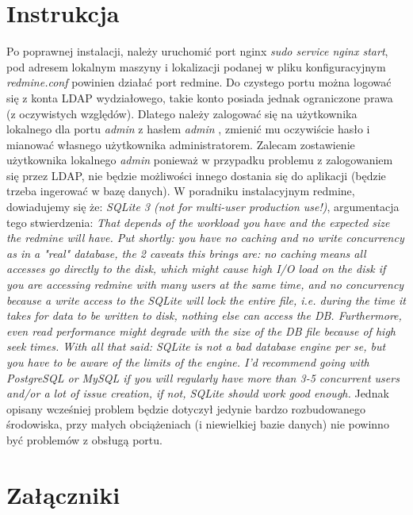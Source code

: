 \documentclass[a4paper,11pt,notitlepage]{article}
\begin{document}
\section{Instrukcja}

Po poprawnej instalacji, należy uruchomić port nginx \textit{sudo service nginx start}, pod adresem lokalnym maszyny i lokalizacji podanej w pliku konfiguracyjnym \textit{redmine.conf} powinien działać port redmine. Do czystego portu można logować się z konta LDAP wydziałowego, takie konto posiada jednak ograniczone prawa (z oczywistych względów). Dlatego należy zalogować się na użytkownika lokalnego dla portu \textit{admin} z hasłem \textit{admin} , zmienić mu oczywiście hasło i mianować własnego użytkownika administratorem. Zalecam zostawienie użytkownika lokalnego \textit{admin} ponieważ w przypadku problemu z zalogowaniem się przez LDAP, nie będzie możliwości innego dostania się do aplikacji (będzie trzeba ingerować w bazę danych). \newline
W poradniku instalacyjnym redmine, dowiadujemy się że: \textit{SQLite 3 (not for multi-user production use!)}, argumentacja tego stwierdzenia: \textit{That depends of the workload you have and the expected size the redmine will have. Put shortly: you have no caching and no write concurrency as in a "real" database, the 2 caveats this brings are: no caching means all accesses go directly to the disk, which might cause high I/O load on the disk if you are accessing redmine with many users at the same time, and no concurrency because a write access to the SQLite will lock the entire file, i.e. during the time it takes for data to be written to disk, nothing else can access the DB. Furthermore, even read performance might degrade with the size of the DB file because of high seek times. With all that said: SQLite is not a bad database engine per se, but you have to be aware of the limits of the engine. I'd recommend going with PostgreSQL or MySQL if you will regularly have more than 3-5 concurrent users and/or a lot of issue creation, if not, SQLite should work good enough.} Jednak opisany wcześniej problem będzie dotyczył jedynie bardzo rozbudowanego środowiska, przy małych obciążeniach (i niewielkiej bazie danych) nie powinno być problemów z obsługą portu.

\newpage
\section{Załączniki}
\end{document}
